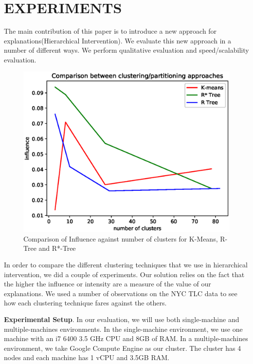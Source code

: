 \section{EXPERIMENTS}
\label{sec:evaluation}
The main contribution of this paper is to introduce a new approach for explanations(Hierarchical Intervention). We evaluate this new approach in a number of different ways. We perform qualitative evaluation and speed/scalability evaluation.

\begin{figure}[H]
\includegraphics[width=\columnwidth]{images/clustering_comparison}
\caption{Comparison of Influence against number of clusters for K-Means, R-Tree and R*-Tree}
\label{fig:clustering_comparison}
\end{figure}

In order to compare the different clustering techniques that we use in hierarchical intervention, we did a couple of experiments. Our solution relies on the fact that the higher the influence or intensity are a measure of the value of our explanations. We used a number of observations on the NYC TLC data to see how each clustering technique fares against the others.

\textbf{Experimental Setup}. 
In our evaluation, we will use both single-machine and multiple-machines environments. 
In the single-machine environment, we use one machine with an i7 6400 3.5 GHz CPU and 8GB of RAM. 
In a multiple-machines environment, we take Google Compute Engine as our cluster. 
The cluster has 4 nodes and each machine has 1 vCPU and 3.5GB RAM.

